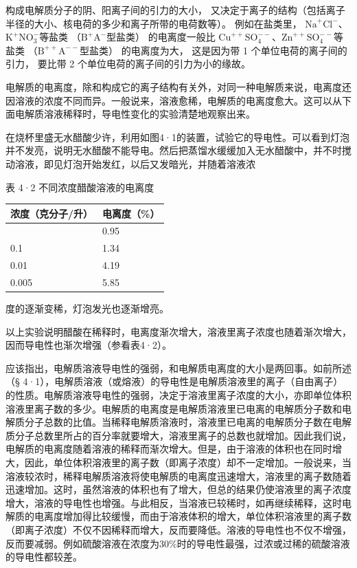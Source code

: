 构成电解质分子的阴、阳离子间的引力的大小，
又决定于离子的结构（包括离子半径的大小、核电荷的多少和离子所带的电荷数等）。
例如在盐类里，
\(\mathrm{Na}^{+}\mathrm{Cl}^{-}\)、\(\mathrm{K}^{+}\mathrm{NO}_{3}^{-}\)等盐类
（\(\mathrm{B}^{+}\mathrm{A}^{-}\)型盐类） 的电离度一般比
\(\mathrm{Cu}^{++}\mathrm{SO}_{4}^{--}\)、\(\mathrm{Zn}^{++}\mathrm{SO}_{4}^{--}\)等盐类
（\(\mathrm{B}^{++}\mathrm{A}^{--}\)型盐类） 的电离度为大， 这是因为带 1
个单位电荷的离子间的引力， 要比带 2 个单位电荷的离子间的引力为小的缘故。

电解质的电离度，除和构成它的离子结构有关外，对同一种电解质来说，电离度还因溶液的浓度不同而异。一般说来，溶液愈稀，电解质的电离度愈大。这可以从下面电解质溶液稀释时，导电性变化的实验清楚地观察出来。

在烧杯里盛无水醋酸少许，利用如图4·1的装置，试验它的导电性。可以看到灯泡并不发亮，说明无水醋酸不能导电。然后把蒸馏水缓缓加入无水醋酸中，并不时搅动溶液，即见灯泡开始发红，以后又发暗光，并随着溶液浓

表 4·2 不同浓度醋酸溶液的电离度

{\def\LTcaptype{none} %
\begin{longtable}[]{@{}ll@{}}
\toprule\noalign{}
浓度（克分子/升） & 电离度（\%） \\
\midrule\noalign{}
\endhead
\bottomrule\noalign{}
\endlastfoot
0.2 & 0.95 \\
0.1 & 1.34 \\
0.01 & 4.19 \\
0.005 & 5.85 \\
\end{longtable}
}

度的逐渐变稀，灯泡发光也逐渐增亮。

以上实验说明醋酸在稀释时，电离度渐次增大，溶液里离子浓度也随着渐次增大，因而导电性也渐次增强（参看表4·2）。

应该指出，电解质溶液导电性的强弱，和电解质电离度的大小是两回事。如前所述（§
4·1），电解质溶液（或熔液）的导电性是电解质溶液里的离子（自由离子）的性质。电解质溶液导电性的强弱，决定于溶液里离子浓度的大小，亦即单位体积溶液里离子数的多少。电解质的电离度是电解质溶液里已电离的电解质分子数和电解质分子总数的比值。当稀释电解质溶液时，溶液里已电离的电解质分子数在电解质分子总数里所占的百分率就要增大，溶液里离子的总数也就增加。因此我们说，电解质的电离度随着溶液的稀释而渐次增大。但是，由于溶液的体积也在同时增大，因此，单位体积溶液里的离子数（即离子浓度）却不一定增加。一般说来，当溶液较浓时，稀释电解质溶液将使电解质的电离度迅速增大，溶液里的离子数随着迅速增加。这时，虽然溶液的体积也有了增大，但总的结果仍使溶液里的离子浓度增大，溶液的导电性也增强。与此相反，当溶液已较稀时，如再继续稀释，这时电解质的电离度增加得比较缓慢，而由于溶液体积的增大，单位体积溶液里的离子数（即离子浓度）不仅不因稀释而增大，反而要降低。溶液的导电性也不仅不增强，反而要减弱。例如硫酸溶液在浓度为30\%时的导电性最强，过浓或过稀的硫酸溶液的导电性都较差。

